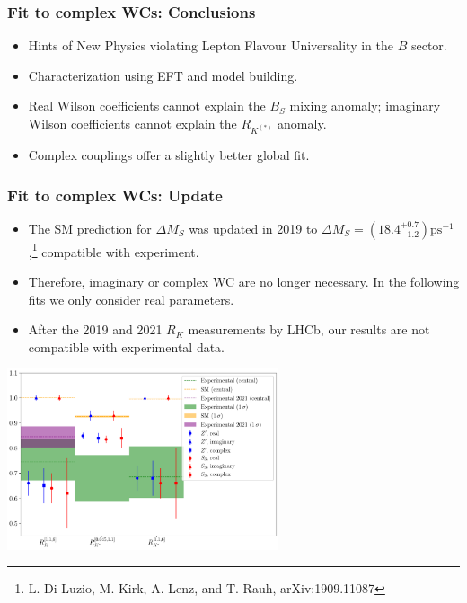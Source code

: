 \documentclass[mathserif, 10pt]{beamer}
\begin{document}
\begin{frame}\frametitle{Fit to complex WCs: Conclusions}
    \begin{itemize}
        \item Hints of New Physics violating Lepton Flavour Universality in the $B$ sector.
        \item Characterization using EFT and model building.
        \item Real Wilson coefficients cannot explain the $B_S$ mixing anomaly; imaginary Wilson coefficients cannot explain the $R_{K^{(*)}}$ anomaly.
        \item Complex couplings offer a slightly better global fit.

    \end{itemize}

\end{frame}

\begin{frame}\frametitle{Fit to complex WCs: Update}
    \begin{itemize}
\item The SM prediction for $\Delta M_S$ was updated in 2019 to $\Delta M_S = (18.4^{+0.7}_{-1.2}) \mathrm{ps}^{-1}$,\footnote[10]{L. Di Luzio, M. Kirk, A. Lenz, and T. Rauh, arXiv:1909.11087} compatible with experiment.
        \item Therefore, imaginary or complex WC are no longer necessary. In the following fits we only consider real parameters.
        \item After the 2019 and 2021 $R_K$ measurements by LHCb, our results are not compatible with experimental data.
    \end{itemize}

    \begin{center}
        \includegraphics[width=0.6\textwidth]{figures/errorplot_RK2021.pdf}
    \end{center}

\end{frame}
\end{document}

